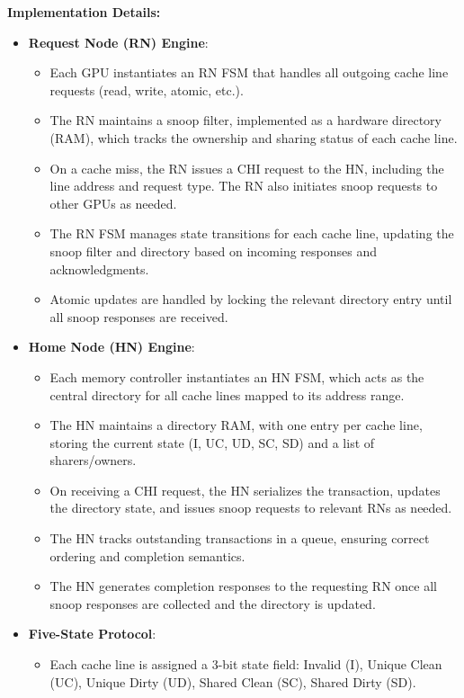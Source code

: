 \documentclass[11pt,a4paper]{article}
\begin{document}
\textbf{Implementation Details:}
\begin{itemize}
    \item \textbf{Request Node (RN) Engine}:
    \begin{itemize}
        \item Each GPU instantiates an RN FSM that handles all outgoing cache line requests (read, write, atomic, etc.).
        \item The RN maintains a snoop filter, implemented as a hardware directory (RAM), which tracks the ownership and sharing status of each cache line.
        \item On a cache miss, the RN issues a CHI request to the HN, including the line address and request type. The RN also initiates snoop requests to other GPUs as needed.
        \item The RN FSM manages state transitions for each cache line, updating the snoop filter and directory based on incoming responses and acknowledgments.
        \item Atomic updates are handled by locking the relevant directory entry until all snoop responses are received.
    \end{itemize}
    \item \textbf{Home Node (HN) Engine}:
    \begin{itemize}
        \item Each memory controller instantiates an HN FSM, which acts as the central directory for all cache lines mapped to its address range.
        \item The HN maintains a directory RAM, with one entry per cache line, storing the current state (I, UC, UD, SC, SD) and a list of sharers/owners.
        \item On receiving a CHI request, the HN serializes the transaction, updates the directory state, and issues snoop requests to relevant RNs as needed.
        \item The HN tracks outstanding transactions in a queue, ensuring correct ordering and completion semantics.
        \item The HN generates completion responses to the requesting RN once all snoop responses are collected and the directory is updated.
    \end{itemize}
    \item \textbf{Five-State Protocol}:
    \begin{itemize}
        \item Each cache line is assigned a 3-bit state field: Invalid (I), Unique Clean (UC), Unique Dirty (UD), Shared Clean (SC), Shared Dirty (SD).

\end{itemize}
\end{itemize}
\end{document}
